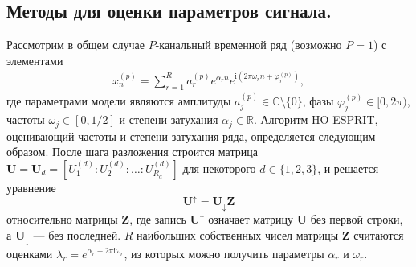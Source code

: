 \documentclass[12pt]{article}
\newcommand{\tX}{\mathsf{X}}
\newcommand{\iu}{\mathrm{i}}
\theoremstyle{definition}
\theoremstyle{remark}
\begin{document}
\subsection{Методы для оценки параметров сигнала.}
Рассмотрим в общем случае $P$-канальный временной ряд (возможно $P=1$) с элементами
\begin{gather*}
  x_n^{(p)}= \sum_{r=1}^{R} a_r^{(p)} e^{\alpha_r n} e^{\iu\left(2\pi
  \omega_r n + \varphi_r^{(p)}\right)},
\end{gather*}
где параметрами модели являются амплитуды $a_j^{(p)} \in
\mathbb{C}\setminus\{0\}$, фазы ${\varphi_j^{(p)} \in [0, 2\pi)}$,
частоты $\omega_j\in [0, 1/2]$ и степени затухания $\alpha_j \in \mathbb{R}$.
Алгоритм HO-ESPRIT, оценивающий частоты и степени затухания ряда,
определяется следующим образом.
После шага разложения 
строится матрица $\mathbf{U} = \mathbf{U}_d = \left[U_1^{(d)} :
U_2^{(d)}:\ldots : U_{R_d}^{(d)}\right]$ для некоторого $d\in \{1, 2,
3\}$, и решается уравнение
\begin{equation*}
  \mathbf{U}^{\uparrow}=\mathbf{U}_{\downarrow}\mathbf{Z}
\end{equation*}
относительно матрицы $\mathbf{Z}$, где запись $\mathbf{U}^{\uparrow}$ означает
матрицу $\mathbf{U}$ без первой строки, а $\mathbf{U}_{\downarrow}$
--- без последней.
$R$ наибольших собственных чисел матрицы $\mathbf{Z}$ считаются
оценками $\lambda_r = e^{\alpha_r + 2\pi\iu \omega_r}$, из которых
можно получить параметры $\alpha_r$ и $\omega_r$.
\end{document}
